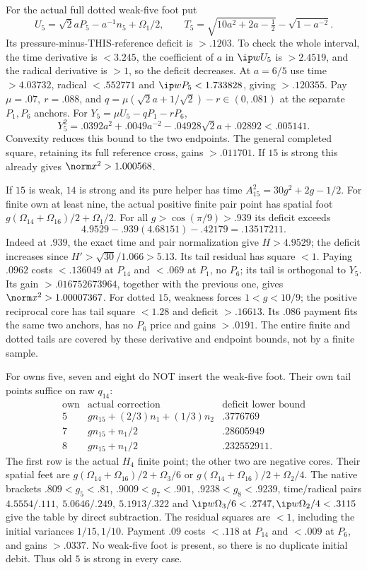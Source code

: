 For the actual full dotted weak-five foot put
\[
 U_5=\sqrt2aP_5-a^{-1}n_5+\Omega_1/2,\qquad
 T_5=\sqrt{10a^2+2a-\tfrac12}-\sqrt{1-a^{-2}}.
\]
Its pressure-minus-THIS-reference deficit is \(>.1203\).
To check the whole interval, the time derivative is \(<3.245\),
the coefficient of \(a\) in \(\ip w{U_5}\) is \(>2.4519\),
and the radical derivative is \(>1\), so the deficit decreases.
At \(a=6/5\) use time \(>4.03732\), radical \(<.552771\)
and \(\ip w{P_5}<1.733828\), giving \(>.120355\).
Pay \(\mu=.07,\ r=.088\), and
\(q=\mu(\sqrt2a+1/\sqrt2)-r\in(0,.081)\) at the separate
\(P_1,P_6\) anchors.
For \(Y_5=\mu U_5-qP_1-rP_6\),
\[
 Y_5^2=.0392a^2+.0049a^{-2}-.04928\sqrt2a+.02892<.005141 .
\]
Convexity reduces this bound to the two endpoints.
The general completed square, retaining its full reference cross,
gains \(>.011701\). If \(15\) is strong this already gives
\(\norm x^2>1.000568\).

If \(15\) is weak, \(14\) is strong and its pure helper
has time \(A_{15}^2=30g^2+2g-1/2\).
For finite own at least nine, the actual positive finite pair point
has spatial foot
\(g(\Omega_{14}+\Omega_{16})/2+\Omega_1/2\).
For all \(g>\cos(\pi/9)>.939\) its deficit exceeds
\[
 4.9529-.939(4.68151)-.42179=.13517211 .
\]
Indeed at \(.939\), the exact time and pair normalization give
\(H>4.9529\); the deficit increases since
\(H'>\sqrt{30}/1.066>5.13\).
Its tail residual has square \(<1\).
Paying \(.0962\) costs \(<.136049\) at \(P_{14}\) and
\(<.069\) at \(P_1\), no \(P_6\); its tail is orthogonal to \(Y_5\).
Its gain \(>.016752673964\), together with the previous one,
gives \(\norm x^2>1.00007367\).
For dotted \(15\), weakness forces \(1<g<10/9\);
the positive reciprocal core has tail square \(<1.28\) and
deficit \(>.16613\). Its \(.086\) payment fits the same two
anchors, has no \(P_6\) price and gains \(>.0191\).
The entire finite and dotted tails are covered by these derivative
and endpoint bounds, not by a finite sample.

For owns five, seven and eight do NOT insert the weak-five foot.
Their own tail points suffice on raw \(q_{14}\):
\[
\begin{array}{c|c|c}
\text{own}&\text{actual correction}&\text{deficit lower bound}\\ \hline
5&g n_{15}+(2/3)n_1+(1/3)n_2&.3776769\\
7&g n_{15}+n_1/2&.28605949\\
8&g n_{15}+n_1/2&.232552911 .
\end{array}
\]
The first row is the actual \(H_4\) finite point; the other two
are negative cores.
Their spatial feet are
\(g(\Omega_{14}+\Omega_{16})/2+\Omega_3/6\)
or \(g(\Omega_{14}+\Omega_{16})/2+\Omega_2/4\).
The native brackets \(.809<g_5<.81\),
\(.9009<g_7<.901\), \(.9238<g_8<.9239\),
time/radical pairs \(4.5554/.111,\ 5.0646/.249,\ 5.1913/.322\)
and \(\ip w{\Omega_3/6}<.2747,\ip w{\Omega_2/4}<.3115\)
give the table by direct subtraction.
The residual squares are \(<1\), including the initial variances
\(1/15,1/10\). Payment \(.09\) costs \(<.118\) at \(P_{14}\)
and \(<.009\) at \(P_6\), and gains \(>.0337\).
No weak-five foot is present, so there is no duplicate initial debit.
Thus old \(5\) is strong in every case.

